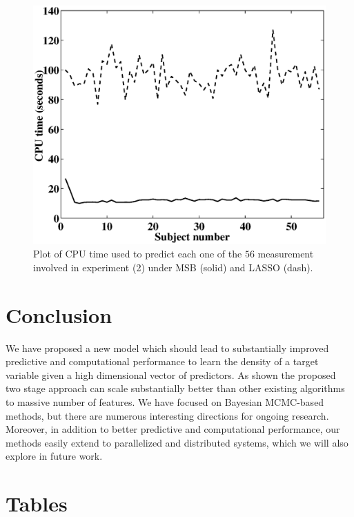 \begin{figure}[h!]
\centering
\includegraphics[width=1.0\linewidth]{Time_real2.eps}
\caption{Plot of CPU time used to predict each one of the $56$ measurement involved in experiment (2) under MSB (solid) and LASSO (dash).} \label{fig:real}
\end{figure}

\section{Conclusion}
We have proposed a new model which should lead to substantially improved predictive and computational performance to learn the density of a target variable given a high dimensional vector of predictors. As shown the proposed two stage approach can scale substantially better than other existing algorithms to massive number of features. We have focused on Bayesian MCMC-based methods, but there are numerous interesting directions for ongoing research. Moreover, in addition to better predictive and computational performance, our methods easily extend to parallelized and distributed systems, which we will also explore in future work.


 
 


\appendix
\section{Tables}

